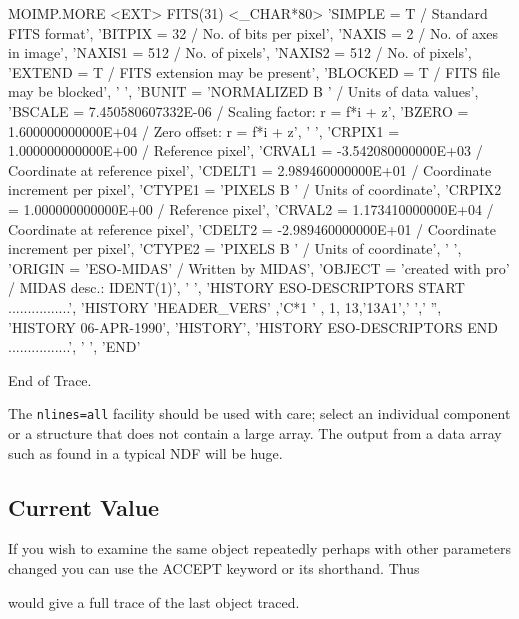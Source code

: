 \documentclass[11pt,nolof]{starlink}
\begin{document}
\small
\begin{terminalv}

MOIMP.MORE  <EXT>
  FITS(31)       <_CHAR*80>
   'SIMPLE  =                    T / Standard FITS format',
   'BITPIX  =                   32 / No. of bits per pixel',
   'NAXIS   =                    2 / No. of axes in image',
   'NAXIS1  =                  512 / No. of pixels',
   'NAXIS2  =                  512 / No. of pixels',
   'EXTEND  =                    T / FITS extension may be present',
   'BLOCKED =                    T / FITS file may be blocked',
   ' ',
   'BUNIT   = 'NORMALIZED       B  ' / Units of data values',
   'BSCALE  =   7.450580607332E-06 / Scaling factor: r = f*i + z',
   'BZERO   =   1.600000000000E+04 / Zero offset: r = f*i + z',
   ' ',
   'CRPIX1  =   1.000000000000E+00 / Reference pixel',
   'CRVAL1  =  -3.542080000000E+03 / Coordinate at reference pixel',
   'CDELT1  =   2.989460000000E+01 / Coordinate increment per pixel',
   'CTYPE1  = 'PIXELS           B  ' / Units of coordinate',
   'CRPIX2  =   1.000000000000E+00 / Reference pixel',
   'CRVAL2  =   1.173410000000E+04 / Coordinate at reference pixel',
   'CDELT2  =  -2.989460000000E+01 / Coordinate increment per pixel',
   'CTYPE2  = 'PIXELS           B  ' / Units of coordinate',
   ' ',
   'ORIGIN  = 'ESO-MIDAS'          / Written by MIDAS',
   'OBJECT  = 'created with pro'   / MIDAS desc.: IDENT(1)',
   ' ',
   'HISTORY  ESO-DESCRIPTORS START   ................',
   'HISTORY  'HEADER_VERS'    ,'C*1 '   ,    1,   13,'13A1',' ',' '',
   'HISTORY  06-APR-1990',
   'HISTORY',
   'HISTORY  ESO-DESCRIPTORS END     ................',
   ' ',
   'END'

End of Trace.
\end{terminalv}
\normalsize
The \texttt{nlines=all} facility should be used with care; select an individual
component or a structure that does not contain a large array.  The
output from a data array such as found in a typical NDF will be huge.

\subsection{Current Value}

If you wish to examine the same object repeatedly perhaps with other
parameters changed you can use the ACCEPT keyword or its shorthand.
Thus
\small
\begin{terminalv}
\end{terminalv}
\normalsize
would give a full trace of the last object traced.
\end{document}
